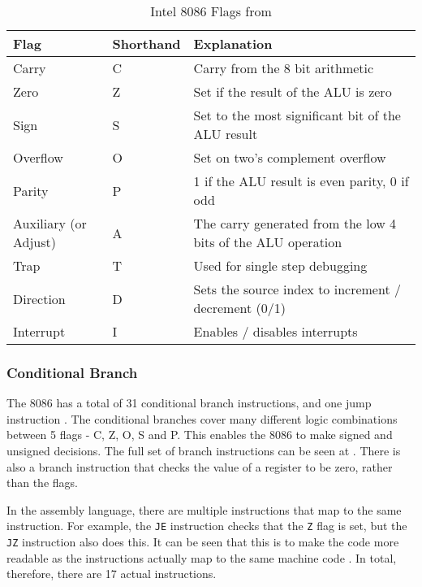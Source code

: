 \documentclass[12pt,a4paper]{article}
\begin{document}
\begin{bibunit}[is-unsrt]
\begin{table}
\centering
\caption{Intel 8086 Flags from \cite{Intel:flags}}
\label{tab:Intel:flags}
\begin{tabular}{p{}p{}p{}}\hline
Flag & Shorthand & Explanation \\ \hline
Carry & C & Carry from the 8 bit arithmetic \\
Zero & Z & Set if the result of the ALU is zero \\
Sign & S & Set to the most significant bit of the ALU result \\
Overflow & O & Set on two's complement overflow \\
Parity & P & 1 if the ALU result is even parity, 0 if odd \cite{flag:p} \\
Auxiliary (or Adjust) & A & The carry generated from the low 4 bits of the ALU operation \cite{flag:a}\\
Trap & T & Used for single step debugging \cite{flag:t} \\
Direction & D & Sets the source index to increment / decrement (0/1) \cite{flag:d} \\
Interrupt & I & Enables / disables interrupts \cite{flag:i} \\
\end{tabular}
\end{table}

\subsubsection{Conditional Branch}

The 8086 has a total of 31 conditional branch instructions, and one jump instruction \cite{Intel:instructionset}.
The conditional branches cover many different logic combinations between 5 flags - C, Z, O, S and P.
This enables the 8086 to make signed and unsigned decisions.
The full set of branch instructions can be seen at \cite{Intel:condjumps}.
There is also a branch instruction that checks the value of a register to be zero, rather than the flags. 

In the assembly language, there are multiple instructions that map to the same instruction.
For example, the \texttt{JE} instruction checks that the \texttt{Z} flag is set, but the \texttt{JZ} instruction also does this.
It can be seen that this is to make the code more readable as the instructions actually map to the same machine code \cite{Intel:datasheet}.
In total, therefore, there are 17 actual instructions.


\end{bibunit}
\end{document}
